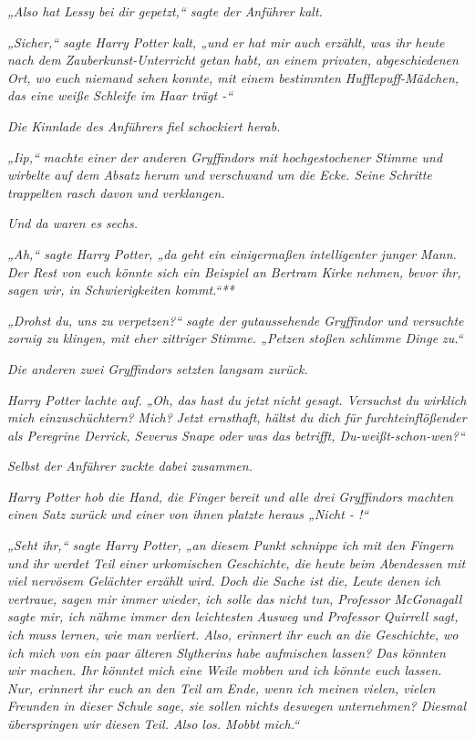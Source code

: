 {\emph{„Also hat Lessy bei dir gepetzt,“ sagte der Anführer kalt.}

\emph{„Sicher,“ sagte Harry Potter kalt, „und er hat mir auch erzählt, was ihr heute nach dem Zauberkunst-Unterricht getan habt, an einem privaten, abgeschiedenen Ort, wo euch niemand sehen konnte, mit einem bestimmten Hufflepuff-Mädchen, das eine weiße Schleife im Haar trägt -“}

\emph{Die Kinnlade des Anführers fiel schockiert herab.}

\emph{„Iip,“} \emph{machte} \emph{einer der anderen Gryffindors mit hochgestochener Stimme und wirbelte auf dem Absatz herum und verschwand um die Ecke. Seine Schritte trappelten rasch davon und verklangen.}

\emph{Und da waren es sechs.}

\emph{„Ah,“ sagte Harry Potter, „da geht ein einigermaßen intelligenter junger Mann. Der Rest von euch könnte sich ein Beispiel an Bertram Kirke nehmen, bevor ihr, sagen wir, in Schwierigkeiten kommt.“**}

\emph{„Drohst du, uns zu verpetzen?“ sagte der gutaussehende Gryffindor und versuchte zornig zu klingen, mit eher zittriger Stimme. „Petzen stoßen schlimme Dinge zu.“}

\emph{Die anderen zwei Gryffindors setzten langsam zurück.}

\emph{Harry Potter} \emph{lachte auf. „Oh, das hast du} \emph{jetzt} \emph{nicht gesagt. Versuchst du} \emph{\emph{wirklich}} \emph{mich einzuschüchtern?} \emph{\emph{Mich?}} \emph{Jetzt ernsthaft, hältst du dich für furchteinflößender als Peregrine Derrick, Severus Snape oder was das betrifft, Du-weißt-schon-wen?“}

\emph{Selbst der Anführer zuckte dabei zusammen.}

\emph{Harry Potter hob die Hand, die Finger bereit und alle drei Gryffindors machten einen Satz zurück und einer von ihnen platzte heraus „Nicht - !“}

\emph{„Seht ihr,“ sagte Harry Potter, „an diesem Punkt schnippe ich mit den Fingern und ihr werdet Teil einer urkomischen Geschichte, die heute beim Abendessen mit viel nervösem Gelächter erzählt wird. Doch die Sache ist die, Leute denen ich vertraue, sagen mir immer wieder, ich solle das nicht tun, Professor McGonagall sagte mir, ich nähme immer den leichtesten} \emph{Ausweg und Professor Quirrell sagt, ich muss lernen, wie man verliert. Also, erinnert ihr euch an die Geschichte, wo ich mich von ein paar älteren Slytherins habe aufmischen lassen? Das könnten wir machen. Ihr könntet mich eine Weile mobben und ich könnte euch lassen. Nur, erinnert ihr euch an den Teil am Ende, wenn ich meinen vielen, vielen Freunden in dieser Schule sage, sie sollen nichts deswegen unternehmen? Diesmal überspringen wir diesen} \emph{Teil. Also los. Mobbt mich.“}

}
